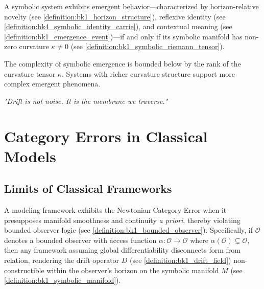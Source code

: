 \begin{theorem}
\label{theorem:bk1_symbolic_emergence_and_curvature}
A symbolic system exhibits emergent behavior—characterized by horizon-relative novelty (see \ref{definition:bk1_horizon_structure}), reflexive identity (see \ref{definition:bk4_symbolic_identity_carrie}), and contextual meaning (see \ref{definition:bk1_emergence_event})—if and only if its symbolic manifold has non-zero curvature $\kappa \neq 0$ (see \ref{definition:bk1_symbolic_riemann_tensor}).
\end{theorem}

\begin{corollary}
\label{corollary:bk1_dimensional_bounds_emergence}
The complexity of symbolic emergence is bounded below by the rank of the curvature tensor $\kappa$. Systems with richer curvature structure support more complex emergent phenomena.
\end{corollary}

\begin{flushright}
\textit{"Drift is not noise. It is the membrane we traverse."}
\end{flushright}

\section{Category Errors in Classical Models}
\label{sec:bk1_category_errors_in_classical_models}

\subsection{Limits of Classical Frameworks}
\label{subsec:bk1_limits_of_classical_frameworks}

\begin{definition}
\label{definition:bk1_newtonian_category_error}
A modeling framework exhibits the Newtonian Category Error when it presupposes manifold smoothness and continuity \emph{a priori}, thereby violating bounded observer logic (see \ref{definition:bk1_bounded_observer}). Specifically, if $\mathcal{O}$ denotes a bounded observer with access function $\alpha: \mathcal{O} \to \mathcal{O}$ where $\alpha(\mathcal{O}) \subsetneq \mathcal{O}$, then any framework assuming global differentiability disconnects form from relation, rendering the drift operator $D$ (see \ref{definition:bk1_drift_field}) non-constructible within the observer's horizon on the symbolic manifold $M$ (see \ref{definition:bk1_symbolic_manifold}).
\end{definition}

